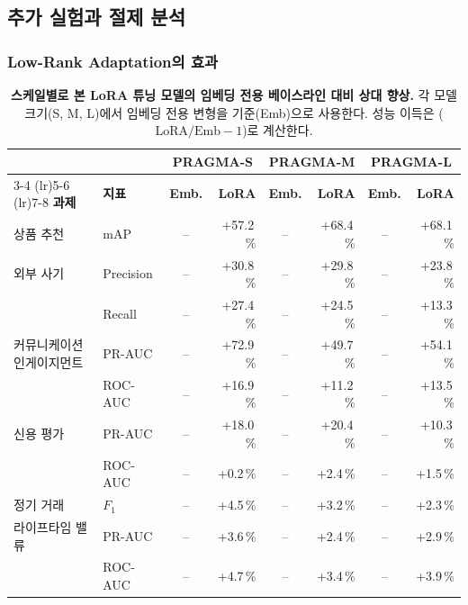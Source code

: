 \subsection{추가 실험과 절제 분석}
\label{sec:ablations}

\subsubsection{Low-Rank Adaptation의 효과}

\label{sec:emb_lora_results}
\begin{table}[t]
\centering
\begin{tabular}{ll cr cr cr}
 & & \multicolumn{2}{c}{\textbf{PRAGMA-S}} & \multicolumn{2}{c}{\textbf{PRAGMA-M}} & \multicolumn{2}{c}{\textbf{PRAGMA-L}} \\
\cmidrule(lr){3-4} \cmidrule(lr){5-6} \cmidrule(lr){7-8}
\textbf{과제} & \textbf{지표} & \textbf{Emb.} & \textbf{LoRA} & \textbf{Emb.} & \textbf{LoRA} & \textbf{Emb.} & \textbf{LoRA} \\
\midrule
상품 추천 & mAP     & -- & +57.2\,\% & -- &  +68.4\,\% & -- &  +68.1\,\%    \\
\addlinespace
외부 사기        & Precision & -- &+30.8\,\% & -- & +29.8\,\% & -- & +23.8\,\% \\
                      & Recall    & -- & +27.4\,\% & -- & +24.5\,\% & -- & +13.3\,\% \\
\addlinespace
커뮤니케이션 인게이지먼트  & PR-AUC  & -- & +72.9\,\% & -- & +49.7\,\% & -- & +54.1\,\% \\
                          & ROC-AUC & -- & +16.9\,\% & -- & +11.2\,\% & -- & +13.5\,\% \\
\addlinespace
신용 평가        & PR-AUC     & -- & +18.0\,\% & -- & +20.4\,\% & -- &  +10.3\,\% \\
                      & ROC-AUC    & -- &  +0.2\,\% & -- &  +2.4\,\% & -- &  +1.5\,\% \\
\addlinespace
정기 거래 & $F_\text{1}$ & -- & +4.5\,\% & -- &  +3.2\,\% & -- &  +2.3\,\% \\
\addlinespace
라이프타임 밸류        & PR-AUC     & -- & +3.6\,\% & -- &  +2.4\,\% & -- &  +2.9\,\% \\
                      & ROC-AUC    & -- & +4.7\,\% & -- &  +3.4\,\% & -- &  +3.9\,\% \\
\end{tabular}
\caption{\textbf{스케일별로 본 LoRA 튜닝 모델의 임베딩 전용 베이스라인 대비 상대 향상.}
각 모델 크기(S, M, L)에서 임베딩 전용 변형을 기준(Emb)으로 사용한다.
성능 이득은 ($\text{LoRA} / \text{Emb} - 1$)로 계산한다.}
\label{tab:lora_vs_emb_scaling}
\end{table}

